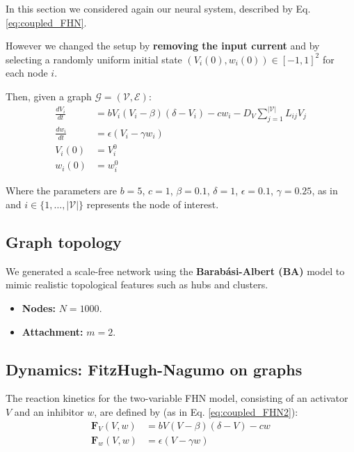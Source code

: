 In this section we considered again our neural system, described by Eq. \eqref{eq:coupled_FHN}.

However we changed the setup by \textbf{removing the input current} and by selecting a randomly uniform initial state $\left( V_i\left( 0 \right), w_i\left( 0 \right) \right) \in \left[-1, 1  \right]^2$ for each node $i$.

Then, given a graph $\mathcal{G} = (\mathcal{V}, \mathcal{E})$:
\begin{equation}
\label{eq:coupled_FHN2}
\begin{aligned}
\frac{dV_i}{dt} &= b V_i (V_i - \beta)(\delta - V_i) - c w_i - D_V \sum_{j=1}^{|\mathcal{V}|} L_{ij} V_j \\
\frac{dw_i}{dt} &= \epsilon (V_i - \gamma w_i) \\
V_i\left( 0 \right) &= V_i^0 \\
w_i\left( 0 \right) &= w_i^0
\end{aligned}
\end{equation}

Where the parameters are $b = 5$, $c = 1$, $\beta = 0.1$, $\delta = 1$, $\epsilon = 0.1$, $\gamma = 0.25$, as in \cite{centofanti2024comconf} and $i \in \{1, \dots, |\mathcal{V}|\}$ represents the node of interest.


\subsection{Graph topology}
We generated a scale-free network using the \textbf{Barabási-Albert (BA)} model to mimic realistic topological features such as hubs and clusters.
\begin{itemize}
    \item \textbf{Nodes:} $N = 1000$.
    \item \textbf{Attachment:} $m = 2$.
\end{itemize}

\subsection{Dynamics: FitzHugh-Nagumo on graphs}
The reaction kinetics for the two-variable FHN model, consisting of an activator $V$ and an inhibitor $w$, are defined by (as in Eq. \eqref{eq:coupled_FHN2}):
\begin{equation}
\begin{aligned}
    \mathbf{F}_V(V, w) &= b V (V - \beta)(\delta - V) - c w \\
    \mathbf{F}_w(V, w) &= \epsilon (V - \gamma w)
\end{aligned}
\end{equation}

